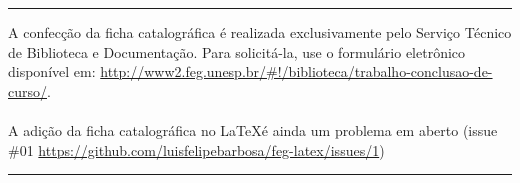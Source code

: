 \documentclass[
  12pt,		%
  a4paper,	%
  openright,%
  oneside,	%
  chapter=TITLE,		%
  section=TITLE,		%
  english,	%
  french,	%
  spanish,	%
  brazil
]{abntex2}
\newcommand{\nomeDoAutor}{
    Nome Completo do Autor
    }
\newcommand{\tituloDoTrabalho}{Título do trabalho somente com a primeira palavra em maiúsculo}
\newcommand{\subtituloDoTrabalho}{subtítulo do trabalho, se houver, todo em minúsculo, exceto para siglas e nomes}
\newcommand{\mesDeEntrega}{Fevereiro}
\newcommand{\anoDeEntrega}{2019}
\newcommand{\nomeDoOrientador}{
    Nome Completo do Orientador
    }
\newcommand{\tituloDoOrientador}{
    Profº Dr.
    }
\newcommand{\nomeDaUniversidade}{
    Universidade Estadual Paulista "Júlio de Mesquita Filho"
    }
\newcommand{\nomeDaCidade}{
    Guaratinguetá
    }
\begin{document}
    
    
    
    \imprimircapa
    \imprimirfolhaderosto
    
    \begin{fichacatalografica}
        \vspace*{15cm} %
        \hrule %
        \begin{center} %
        \begin{minipage}[c]{12.5cm} %
        A confecção da ficha catalográfica é realizada exclusivamente pelo Serviço Técnico de Biblioteca e Documentação. Para solicitá-la, use o formulário eletrônico disponível em: \url{http://www2.feg.unesp.br/#!/biblioteca/trabalho-conclusao-de-curso/}.
        \\
        \\
    
         A adição da ficha catalográfica no \LaTeX é ainda um problema em aberto (issue $\#$01 \url{https://github.com/luisfelipebarbosa/feg-latex/issues/1})
        
        \end{minipage}
        \end{center}
        \hrule
    \end{fichacatalografica}
    
\end{document}
